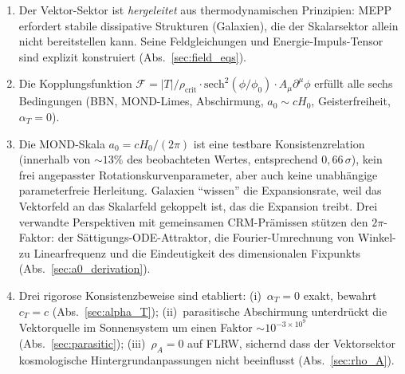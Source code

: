 \documentclass[aps,prd,twocolumn,superscriptaddress,nofootinbib]{revtex4-2}
\begin{document}
\begin{enumerate}
\item Der Vektor-Sektor ist \textit{hergeleitet} aus thermodynamischen Prinzipien: MEPP erfordert stabile dissipative Strukturen (Galaxien), die der Skalarsektor allein nicht bereitstellen kann. Seine Feldgleichungen und Energie-Impuls-Tensor sind explizit konstruiert (Abs.~\ref{sec:field_eqs}).

\item Die Kopplungsfunktion $\mathcal{F} = |T|/\rho_{\mathrm{crit}} \cdot \mathrm{sech}^2(\phi/\phi_0) \cdot A_\mu\partial^\mu\phi$ erf\"ullt alle sechs Bedingungen (BBN, MOND-Limes, Abschirmung, $a_0 \sim cH_0$, Geisterfreiheit, $\alpha_T = 0$).

\item Die MOND-Skala $a_0 = cH_0/(2\pi)$ ist eine testbare Konsistenzrelation (innerhalb von $\sim 13\%$ des beobachteten Wertes, entsprechend $0{,}66\,\sigma$), kein frei angepasster Rotationskurvenparameter, aber auch keine unabh\"angige parameterfreie Herleitung. Galaxien ``wissen'' die Expansionsrate, weil das Vektorfeld an das Skalarfeld gekoppelt ist, das die Expansion treibt. Drei verwandte Perspektiven mit gemeinsamen CRM-Pr\"amissen st\"utzen den $2\pi$-Faktor: der S\"attigungs-ODE-Attraktor, die Fourier-Umrechnung von Winkel- zu Linearfrequenz und die Eindeutigkeit des dimensionalen Fixpunkts (Abs.~\ref{sec:a0_derivation}).

\item Drei rigorose Konsistenzbeweise sind etabliert: (i)~$\alpha_T = 0$ exakt, bewahrt $c_T = c$ (Abs.~\ref{sec:alpha_T}); (ii)~parasitische Abschirmung unterdr\"uckt die Vektorquelle im Sonnensystem um einen Faktor $\sim 10^{-3 \times 10^9}$ (Abs.~\ref{sec:parasitic}); (iii)~$\rho_A = 0$ auf FLRW, sichernd dass der Vektorsektor kosmologische Hintergrundanpassungen nicht beeinflusst (Abs.~\ref{sec:rho_A}).


\end{enumerate}
\end{document}
